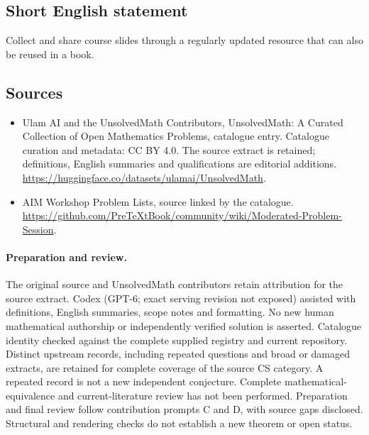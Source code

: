 \documentclass[11pt]{article}
\begin{document}
\subsection{Short English statement}
Collect and share course slides through a regularly updated resource that can also be reused in a book.
\subsection{Sources}
\begin{itemize}
\item[\hypertarget{source:statement:1}{S1}] Ulam AI and the UnsolvedMath Contributors, UnsolvedMath: A Curated Collection of Open Mathematics Problems, catalogue entry. Catalogue curation and metadata: CC BY 4.0. The source extract is retained; definitions, English summaries and qualifications are editorial additions.
\url{https://huggingface.co/datasets/ulamai/UnsolvedMath}.
\item[\hypertarget{source:statement:2}{S2}] AIM Workshop Problem Lists, source linked by the catalogue.
\url{https://github.com/PreTeXtBook/community/wiki/Moderated-Problem-Session}.
\end{itemize}
\paragraph{Preparation and review.}
The original source and UnsolvedMath contributors retain attribution for the source extract. Codex (GPT-6; exact serving revision not exposed) assisted with definitions, English summaries, scope notes and formatting. No new human mathematical authorship or independently verified solution is asserted. Catalogue identity checked against the complete supplied registry and current repository. Distinct upstream records, including repeated questions and broad or damaged extracts, are retained for complete coverage of the source CS category. A repeated record is not a new independent conjecture. Complete mathematical-equivalence and current-literature review has not been performed. Preparation and final review follow contribution prompts C and D, with source gaps disclosed. Structural and rendering checks do not establish a new theorem or open status.
\label{end:statement}
\end{document}
